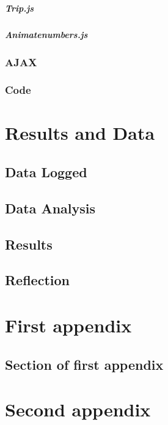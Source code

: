 \documentclass{mproj}
\begin{document}
\paragraph{Trip.js}
\paragraph{Animatenumbers.js}
\subsection{AJAX}
\subsection{Code}
\label{subsec:code}

\chapter{Results and Data}\label{results}
\section{Data Logged}
\section{Data Analysis}
\section{Results}
\section{Reflection}








\appendix %
\chapter{First appendix}

\section{Section of first appendix}

\chapter{Second appendix}



\end{document}
